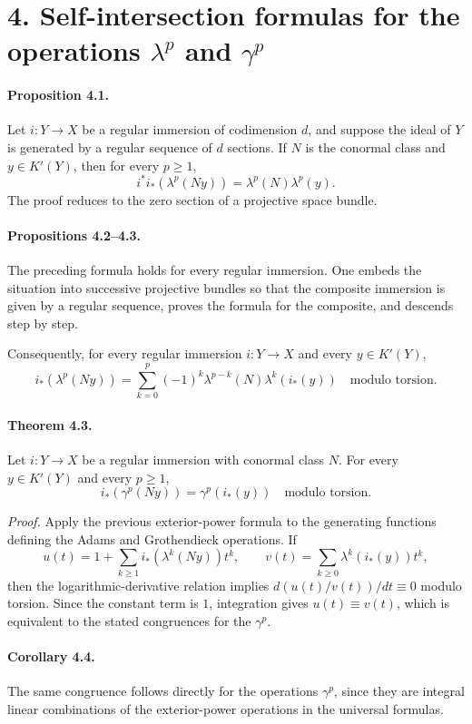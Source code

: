 \documentclass[12pt]{article}
\begin{document}
\section*{4. Self-intersection formulas for the operations $\lambda^p$ and $\gamma^p$}

\paragraph{Proposition 4.1.} Let $i:Y\to X$ be a regular immersion of codimension $d$, and suppose the ideal of $Y$ is generated by a regular sequence of $d$ sections. If $N$ is the conormal class and $y\in K'(Y)$, then for every $p\geq1$,
\[
i^*i_*(\lambda^p(Ny))=\lambda^p(N)\lambda^p(y).
\]
The proof reduces to the zero section of a projective space bundle.

\paragraph{Propositions 4.2--4.3.} The preceding formula holds for every regular immersion. One embeds the situation into successive projective bundles so that the composite immersion is given by a regular sequence, proves the formula for the composite, and descends step by step.

Consequently, for every regular immersion $i:Y\to X$ and every $y\in K'(Y)$,
\[
i_*(\lambda^p(Ny))=\sum_{k=0}^{p}(-1)^k\lambda^{p-k}(N)\lambda^k(i_*(y))
\quad\text{modulo torsion}.
\]

\paragraph{Theorem 4.3.} Let $i:Y\to X$ be a regular immersion with conormal class $N$. For every $y\in K'(Y)$ and every $p\geq1$,
\[
i_*(\gamma^p(Ny))=\gamma^p(i_*(y))
\quad\text{modulo torsion}.
\]

\emph{Proof.} Apply the previous exterior-power formula to the generating functions defining the Adams and Grothendieck operations. If
\[
u(t)=1+\sum_{k\geq1}i_*(\lambda^k(Ny))t^k,
\qquad
v(t)=\sum_{k\geq0}\lambda^k(i_*(y))t^k,
\]
then the logarithmic-derivative relation implies $d(u(t)/v(t))/dt\equiv0$ modulo torsion. Since the constant term is $1$, integration gives $u(t)\equiv v(t)$, which is equivalent to the stated congruences for the $\gamma^p$.

\paragraph{Corollary 4.4.} The same congruence follows directly for the operations $\gamma^p$, since they are integral linear combinations of the exterior-power operations in the universal formulas.
\end{document}
